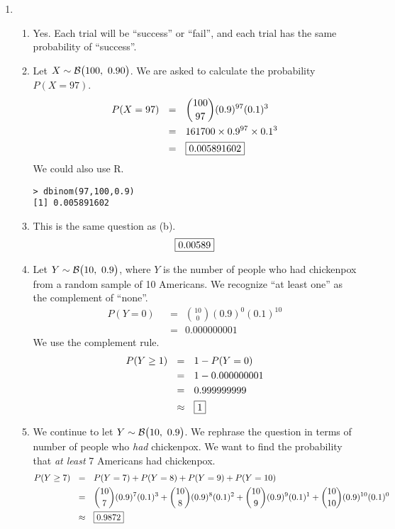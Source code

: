 \documentclass[12pt,letterpaper]{article}
\begin{document}
\begin{enumerate}
\item \begin{enumerate}
\item Yes. Each trial will be ``success'' or ``fail'', and each trial has the same probability of ``success''.
\item Let $X\sim \mathcal{B}\big(100,~0.90\big)$. We are asked to calculate the probability $P(X=97)$.
\begin{align*}
P(X = 97) ~~&=~~ {100\choose 97}(0.9)^{97}(0.1)^3\\
            &=~~ 161700\times 0.9^{97}\times0.1^3\\
            &=~~ \fbox{0.005891602}
\end{align*}
We could also use R.
\begin{verbatim}
> dbinom(97,100,0.9)
[1] 0.005891602
\end{verbatim}
\item This is the same question as (b).
$$\fbox{0.00589} $$
\item Let $Y\sim \mathcal{B}\big(10,~0.9\big)$, where $Y$ is the number of people who had chickenpox from a random sample of 10 Americans. We recognize ``at least one'' as the complement of ``none''.
\begin{align*}
P(Y = 0) ~~&=~~ {10\choose 0}(0.9)^{0}(0.1)^{10}\\
            &=~~ 0.000000001
\end{align*}
We use the complement rule.
\begin{align*}
P(Y \ge 1) ~~&=~~ 1 - P(Y = 0)\\
            &=~~ 1-0.000000001\\
            &=~~ 0.999999999\\
            &\approx~~ \fbox{1}
\end{align*}
\item We continue to let $Y\sim \mathcal{B}\big(10,~0.9\big)$. We rephrase the question in terms of number of people who \emph{had} chickenpox. We want to find the probability that \emph{at least} 7 Americans had chickenpox.
\begin{align*}
P(Y \ge 7) ~~&=~~ P(Y=7)+P(Y=8)+P(Y=9)+P(Y=10) \\
 &=~~ {10\choose 7}(0.9)^{7}(0.1)^{3}+
      {10\choose 8}(0.9)^{8}(0.1)^{2}+
      {10\choose 9}(0.9)^{9}(0.1)^{1}+
     {10\choose 10}(0.9)^{10}(0.1)^{0}\\
 &\approx~~ \fbox{0.9872}
\end{align*}
\end{enumerate}
\newpage


\end{enumerate}
\end{document}
